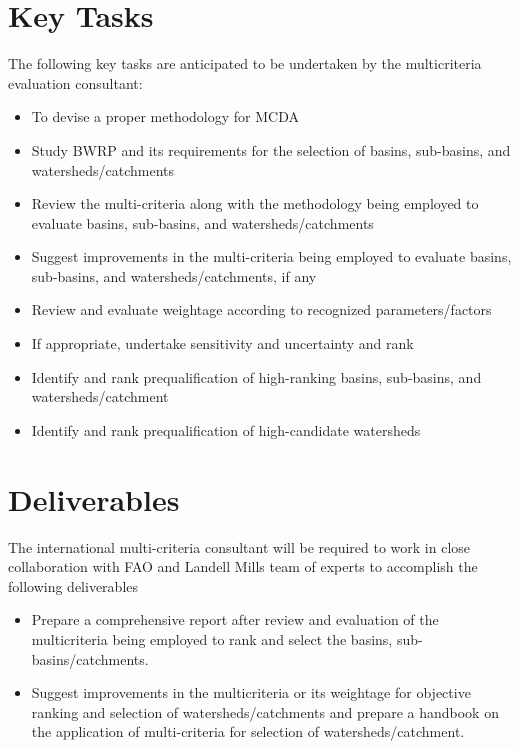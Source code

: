 \section*{Key Tasks}
The following key tasks are anticipated to be undertaken by the multicriteria evaluation consultant:
\begin{itemize}
    \item To devise a proper methodology for MCDA
    \item Study BWRP and its requirements for the selection of basins, sub-basins, and watersheds/catchments
    \item Review the multi-criteria along with the methodology being employed to evaluate basins, sub-basins, and watersheds/catchments
    \item Suggest improvements in the multi-criteria being employed to evaluate basins, sub-basins, and watersheds/catchments, if any
    \item Review and evaluate weightage according to recognized parameters/factors
    \item If appropriate, undertake sensitivity and uncertainty and rank
    \item Identify and rank prequalification of high-ranking basins, sub-basins, and watersheds/catchment
    \item Identify and rank prequalification of high-candidate watersheds
\end{itemize}

\section*{Deliverables}
The international multi-criteria consultant will be required to work in close collaboration with FAO and Landell Mills team of experts to accomplish the following deliverables
\begin{itemize}
    \item Prepare a comprehensive report after review and evaluation of the multicriteria being employed to rank and select the basins, sub-basins/catchments.
    \item Suggest improvements in the multicriteria or its weightage for objective ranking and selection of watersheds/catchments and prepare a handbook on the application of multi-criteria for selection of watersheds/catchment.
\end{itemize}